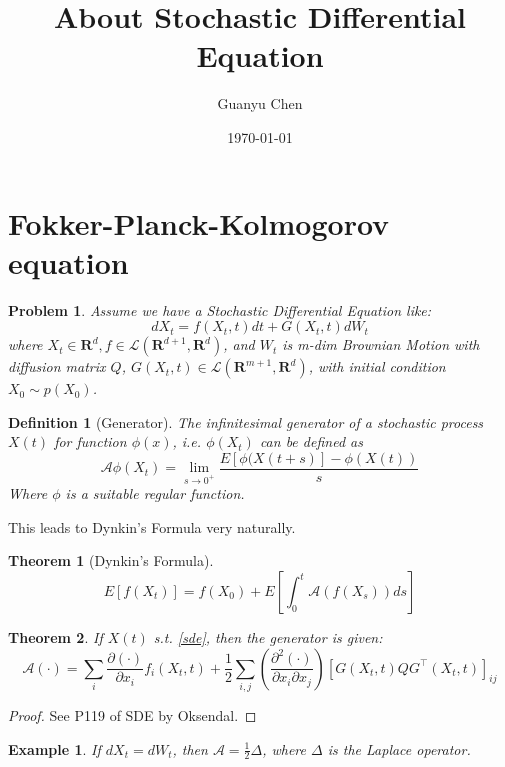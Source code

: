 \documentclass{article}
\title{About Stochastic Differential Equation}
\author{Guanyu Chen}
\date{\today}
\newtheorem{theorem}{Theorem}
\newtheorem{definition}{Definition}
\newtheorem{example}{Example}
\newtheorem{problem}{Problem}
\begin{document}
\maketitle
\tableofcontents
\newpage
\section{Fokker-Planck-Kolmogorov equation}
\begin{problem}
Assume we have a Stochastic Differential Equation like:
\begin{equation}\label{sde}
    dX_t = f(X_t, t)dt + G(X_t, t)dW_t
\end{equation}
where $X_t\in \mathbf{R}^d,f\in \mathcal{L}(\mathbf{R}^{d+1}, \mathbf{R}^d)$, and $W_t$ is m-dim Brownian Motion with diffusion matrix $Q$, 
$G(X_t, t)\in \mathcal{L}(\mathbf{R}^{m+1}, \mathbf{R}^d)$, with initial condition $X_0\sim p(X_0)$.
\end{problem}
\begin{definition}[Generator]
    The infinitesimal generator of a stochastic process $X(t)$ for function $\phi(x)$, i.e. $\phi(X_t)$ can be defined as
    \begin{equation}
        \mathcal{A} \phi(X_t)=\lim _{s \rightarrow 0^{+}} \frac{E[\phi(X(t+s)]-\phi(X(t))}{s}
    \end{equation}
    Where  $\phi$  is a suitable regular function.
\end{definition}
This leads to Dynkin's Formula very naturally.
\begin{theorem}[Dynkin's Formula]
    \begin{equation}
        E[f(X_t)]=f(X_0)+E\left[\int_0^t\mathcal{A}(f(X_s))ds\right]
    \end{equation}
\end{theorem}

\begin{theorem}
    If  $X(t)$  s.t. \ref{sde}, then the generator is given:
\begin{equation}
    \mathcal{A}(\cdot)=\sum_{i} \frac{\partial(\cdot)}{\partial x_{i}} f_{i}(X_t, t)+\frac{1}{2} \sum_{i, j}\left(\frac{\partial^{2}(\cdot)}{\partial x_{i} \partial x_{j}}\right)\left[G(X_t, t)Q G^{\top}(X_t, t)\right]_{i j}
\end{equation}
\end{theorem}
\begin{proof}
    See P119 of SDE by Oksendal.
\end{proof}

\begin{example}
    If $dX_t=dW_t$, then $\mathcal{A}=\frac{1}{2}\Delta$, where $\Delta$ is the Laplace operator.
\end{example}
\end{document}
